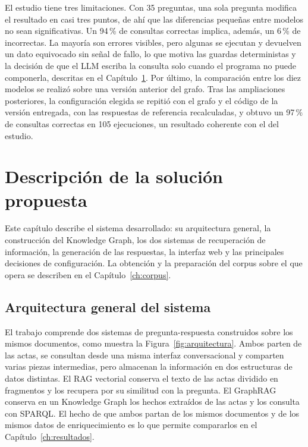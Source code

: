\documentclass[11pt, a4paper]{report}
\begin{document}
	El estudio tiene tres limitaciones. Con 35 preguntas, una sola pregunta modifica el resultado en casi tres puntos, de ahí que las
	diferencias pequeñas entre modelos no sean significativas. Un 94\,\% de consultas correctas implica, además, un 6\,\% de
	incorrectas. La mayoría son errores visibles, pero algunas se ejecutan y
	devuelven un dato equivocado sin señal de fallo, lo que motiva las guardas
	deterministas y la decisión de que el LLM escriba la consulta solo cuando el
	programa no puede componerla, descritas en el Capítulo~\ref{ch:solucion}. Por
	último, la comparación entre los diez modelos se realizó sobre una versión
	anterior del grafo. Tras las ampliaciones posteriores, la configuración elegida
	se repitió con el grafo y el código de la versión entregada, con las respuestas
	de referencia recalculadas, y obtuvo un 97\,\% de consultas correctas en 105
	ejecuciones, un resultado coherente con el del estudio.

	\chapter{Descripción de la solución propuesta}
	\label{ch:solucion}

	Este capítulo describe el sistema desarrollado: su arquitectura general, la
	construcción del Knowledge Graph, los dos sistemas de recuperación de
	información, la generación de las respuestas, la interfaz web y las
	principales decisiones de configuración. La obtención y la preparación del
	corpus sobre el que opera se describen en el Capítulo~\ref{ch:corpus}.

	\section{Arquitectura general del sistema}

	El trabajo comprende dos sistemas de pregunta-respuesta construidos sobre los
	mismos documentos, como muestra la Figura~\ref{fig:arquitectura}. Ambos parten de las actas, se consultan desde una misma interfaz conversacional
	y comparten varias piezas intermedias, pero almacenan la información en
	dos estructuras de datos distintas. El RAG vectorial conserva el texto de las
	actas dividido en fragmentos y los recupera por su similitud con la pregunta.
	El GraphRAG conserva en un Knowledge Graph los hechos extraídos de las
	actas y los consulta con SPARQL. El hecho de que ambos partan de los mismos
	documentos y de los mismos datos de enriquecimiento es lo que permite
	compararlos en el Capítulo~\ref{ch:resultados}.
\end{document}
